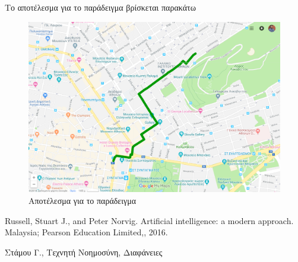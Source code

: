 \documentclass[a4paper,12pt]{article}
\begin{document}
Το αποτέλεσμα για το παράδειγμα βρίσκεται παρακάτω
\begin{figure}[H]
    \centering
    \includegraphics[scale=0.3]{example.png}
    \caption{Αποτέλεσμα για το παράδειγμα}
    \label{fig:my_label}
\end{figure}



\begin{thebibliography}{9}

 Russell, Stuart J., and Peter Norvig. Artificial intelligence: a modern approach. Malaysia; Pearson Education Limited,, 2016.

 Στάμου Γ., Τεχνητή Νοημοσύνη, Διαφάνειες

\end{thebibliography}
\end{document}
